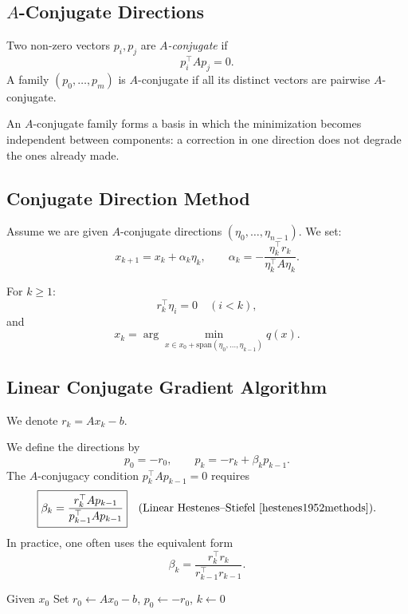 \subsection{\texorpdfstring{$A$}{A}-Conjugate Directions}

\begin{definition}
Two non-zero vectors $p_i,p_j$ are \emph{$A$-conjugate} if
\[
p_i^\top A p_j = 0.
\]
A family $(p_0,\dots,p_m)$ is $A$-conjugate if all its distinct vectors are pairwise $A$-conjugate.
\end{definition}

An $A$-conjugate family forms a basis in which the minimization becomes independent between components: a correction in one direction does not degrade the ones already made.

\subsection{Conjugate Direction Method}

Assume we are given $A$-conjugate directions $(\eta_0,\dots,\eta_{n-1})$. We set:
\[
x_{k+1} = x_k + \alpha_k \eta_k, \qquad
\alpha_k = -\frac{\eta_k^\top r_k}{\eta_k^\top A \eta_k}.
\]

\begin{theoreme}
For $k \ge 1$:
\[
r_k^\top \eta_i = 0 \quad (i<k),
\]
and
\[
\boxed{x_k = \arg\min_{x \in x_0 + \mathrm{span}(\eta_0,\dots,\eta_{k-1})} q(x)}.
\]
\end{theoreme}

\subsection{Linear Conjugate Gradient Algorithm}

We denote $r_k = A x_k - b$.

We define the directions by
\[
p_0 = -r_0,\qquad p_k = -r_k + \beta_k p_{k-1}.
\]
The $A$-conjugacy condition $p_k^\top A p_{k-1}=0$ requires
\[
\boxed{\beta_k = \frac{r_k^\top A p_{k-1}}{p_{k-1}^\top A p_{k-1}}}
\quad\text{(Linear Hestenes–Stiefel \cite{hestenes1952methods}).}
\]
In practice, one often uses the equivalent form
\[
\beta_k = \frac{r_k^\top r_k}{r_{k-1}^\top r_{k-1}}.
\]

\begin{algorithm}[H]
\caption{Preliminary Version of Conjugate Gradient}
\label{alg:cg-preliminary}
Given $x_0$\;
Set $r_0 \leftarrow Ax_0 - b$, $p_0 \leftarrow -r_0$, $k \leftarrow 0$\;
\end{algorithm}

